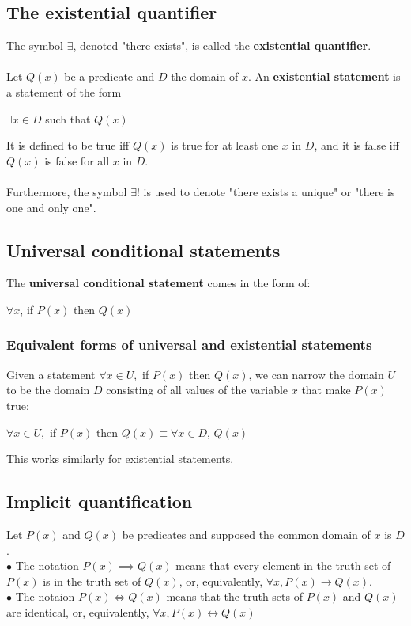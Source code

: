 \documentclass[a4paper]{article}
\begin{document}
\subsection{The existential quantifier}
The symbol $\exists$, denoted "there exists", is called the \textbf{existential quantifier}.\\ \\
Let $Q(x)$ be a predicate and $D$ the domain of $x$. An \textbf{existential statement} is a statement of the form 
\begin{center}
	$\exists x \in D$ such that $Q(x)$
\end{center}
It is defined to be true iff $Q(x)$ is true for at least one $x$ in $D$, and it is false iff $Q(x)$ is false for all $x$ in $D$.\\ \\ 
Furthermore, the symbol $\exists!$ is used to denote "there exists a unique" or "there is one and only one". 
\subsection{Universal conditional statements}
The \textbf{universal conditional statement} comes in the form of:
\begin{center}
	$\forall x$, if $P(x)$ then $Q(x)$
\end{center}
\subsubsection{Equivalent forms of universal and existential statements}
Given a statement $\forall x \in U,$ if $P(x)$ then $Q(x)$, we can narrow the domain $U$ to be the domain $D$ consisting of all values of the variable $x$ that make $P(x)$ true:
\begin{center}
	$\forall x \in U,$ if $P(x)$ then $Q(x) \equiv \forall x \in D$, $Q(x)$
\end{center} 
This works similarly for existential statements.
\subsection{Implicit quantification}
Let $P(x)$ and $Q(x)$ be predicates and supposed the common domain of $x$ is $D$.\\
$\bullet$ The notation $P(x) \implies Q(x)$ means that every element in the truth set of $P(x)$ is in the truth set of $Q(x)$, or, equivalently, $\forall x, P(x) \rightarrow Q(x)$.\\
$\bullet$ The notaion $P(x) \iff Q(x)$ means that the truth sets of $P(x)$ and $Q(x)$ are identical, or, equivalently, $\forall x, P(x) \leftrightarrow Q(x)$
\end{document}
